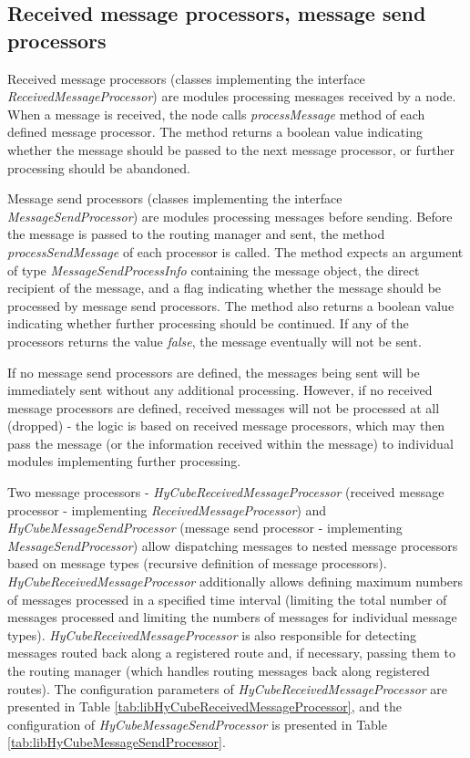 \subsection{Received message processors, message send processors}
\label{sec:libMessageProcessors}

Received message processors (classes implementing the interface \emph{ReceivedMessageProcessor}) are modules processing messages received by a node. When a message is received, the node calls \emph{processMessage} method of each defined message processor. The method returns a boolean value indicating whether the message should be passed to the next message processor, or further processing should be abandoned.

Message send processors (classes implementing the interface \emph{MessageSendProcessor}) are modules processing messages before sending. Before the message is passed to the routing manager and sent, the method \emph{processSendMessage} of each processor is called. The method expects an argument of type \emph{MessageSendProcessInfo} containing the message object, the direct recipient of the message, and a flag indicating whether the message should be processed by message send processors. The method also returns a boolean value indicating whether further processing should be continued. If any of the processors returns the value \emph{false}, the message eventually will not be sent.

If no message send processors are defined, the messages being sent will be immediately sent without any additional processing. However, if no received message processors are defined, received messages will not be processed at all (dropped) - the logic is based on received message processors, which may then pass the message (or the information received within the message) to individual modules implementing further processing.

Two message processors - \emph{HyCubeReceivedMessageProcessor} (received message processor - implementing \emph{ReceivedMessageProcessor}) and \emph{HyCubeMessageSendProcessor} (message send processor - implementing \emph{MessageSendProcessor}) allow dispatching messages to nested message processors based on message types (recursive definition of message processors). \emph{HyCubeReceivedMessageProcessor} additionally allows defining maximum numbers of messages processed in a specified time interval (limiting the total number of messages processed and limiting the numbers of messages for individual message types). \emph{HyCubeReceivedMessageProcessor} is also responsible for detecting messages routed back along a registered route and, if necessary, passing them to the routing manager (which handles routing messages back along registered routes). The configuration parameters of \emph{HyCubeReceivedMessageProcessor} are presented in Table \ref{tab:libHyCubeReceivedMessageProcessor}, and the configuration of \emph{HyCubeMessageSendProcessor} is presented in Table \ref{tab:libHyCubeMessageSendProcessor}.

